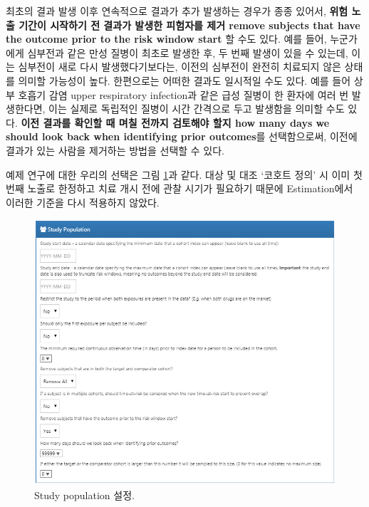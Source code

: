 \documentclass[10.5pt]{book}
\theoremstyle{definition}
\theoremstyle{definition}
\theoremstyle{definition}
\theoremstyle{remark}
\begin{document}
최초의 결과 발생 이후 연속적으로 결과가 추가 발생하는 경우가 종종
있어서, \textbf{위험 노출 기간이 시작하기 전 결과가 발생한 피험자를 제거
remove subjects that have the outcome prior to the risk window start} 할
수도 있다. 예를 들어, 누군가에게 심부전과 같은 만성 질병이 최초로 발생한
후, 두 번째 발생이 있을 수 있는데, 이는 심부전이 새로 다시
발생했다기보다는, 이전의 심부전이 완전히 치료되지 않은 상태를 의미할
가능성이 높다. 한편으로는 어떠한 결과도 일시적일 수도 있다. 예를 들어
상부 호흡기 감염 upper respiratory infection과 같은 급성 질병이 한
환자에 여러 번 발생한다면, 이는 실제로 독립적인 질병이 시간 간격으로
두고 발생함을 의미할 수도 있다. \textbf{이전 결과를 확인할 때 며칠
전까지 검토해야 할지 how many days we should look back when identifying
prior outcomes}를 선택함으로써, 이전에 결과가 있는 사람을 제거하는
방법을 선택할 수 있다.

예제 연구에 대한 우리의 선택은 그림 \ref{fig:studyPopulation}과 같다.
대상 및 대조 `코호트 정의' 시 이미 첫 번째 노출로 한정하고 치료 개시
전에 관찰 시기가 필요하기 때문에 Estimation에서 이러한 기준을 다시
적용하지 않았다.

\begin{figure}

{\centering \includegraphics[width=1\linewidth]{images/PopulationLevelEstimation/studyPopulation} 

}

\caption{Study population 설정.}\label{fig:studyPopulation}
\end{figure}
\end{document}
